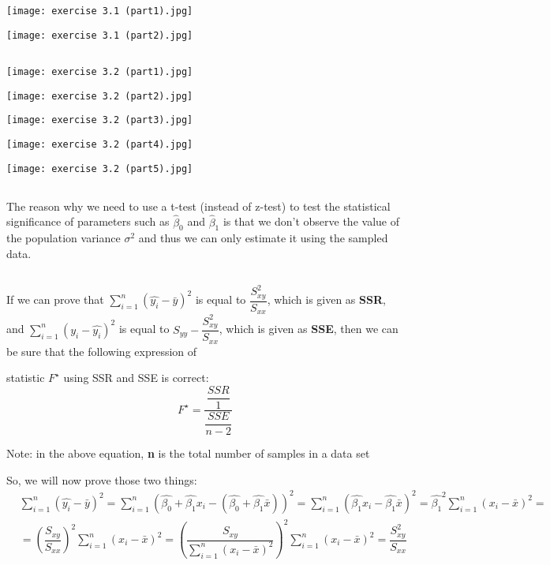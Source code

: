 \documentclass{homework2_template}
\begin{document}
\exercise{}
\subsection{}
\texttt{[image: exercise 3.1 (part1).jpg]}

\texttt{[image: exercise 3.1 (part2).jpg]}

\subsection{}

\texttt{[image: exercise 3.2 (part1).jpg]}

\texttt{[image: exercise 3.2 (part2).jpg]}

\texttt{[image: exercise 3.2 (part3).jpg]}

\texttt{[image: exercise 3.2 (part4).jpg]}

\texttt{[image: exercise 3.2 (part5).jpg]}

\subsection{}
The reason why we need to use a t-test (instead of z-test) to test the statistical significance of parameters such as $\hat{\beta}_0$ and $\hat{\beta}_1$ is that we don't observe the value of the population variance $\sigma^2$ and thus we can only estimate it using the sampled data. 

\exercise{}
\subsection{}

If we can prove that $\sum_{i=1}^n (\hat{y_i} - \bar{y})^2$ is equal to $ \dfrac{S_{xy}^2}{S_{xx}}$, which is given as \textbf{SSR}, and $\sum_{i=1}^n (y_i - \hat{y_i})^2$ is equal to $S_{yy} - \dfrac{S_{xy}^2}{S_{xx}}$, which is given as \textbf{SSE}, then we can be sure that the following expression of

statistic $F^\star$ using SSR and SSE is correct:
\[F^\star = \dfrac{\dfrac{SSR}{1}}{\dfrac{SSE}{n-2}} \]

{\small Note: in the above equation, \textbf{n} is the total number of samples in a data set}

So, we will now prove those two things:
\begin{equation}
\begin{split}
& \sum_{i=1}^n (\hat{y_i} - \bar{y})^2 = \sum_{i=1}^n (\hat{\beta_0} + \hat{\beta_1}x_i - (\hat{\beta_0} + \hat{\beta_1}\bar{x}))^2 = \sum_{i=1}^n ( \hat{\beta_1}x_i - \hat{\beta_1}\bar{x})^2 = \hat{\beta_1}^2\sum_{i=1}^n (x_i - \bar{x})^2 = \\
& = \left(\dfrac{S_{xy}}{S_{xx}}\right)^2 \sum_{i=1}^n (x_i - \bar{x})^2 = \left(\dfrac{S_{xy}}{\sum_{i=1}^n (x_i - \bar{x})^2}\right)^2\sum_{i=1}^n (x_i - \bar{x})^2 = \dfrac{S_{xy}^2}{S_{xx}}
\end{split}
\end{equation}
\end{document}
